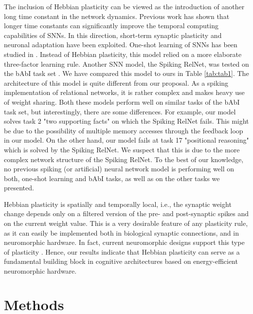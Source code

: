 \documentclass{article}
\begin{document}
The inclusion of Hebbian plasticity can be viewed as the introduction of another long time constant in the network dynamics. Previous work has shown that longer time constants can significantly improve the temporal computing capabilities of SNNs. In this direction, short-term synaptic plasticity \cite{mongillo2008synaptic,maass2002real} and neuronal adaptation \cite{salaj2021spike} have been exploited. One-shot learning of SNNs has been studied in \cite{scherr2020one}. Instead of Hebbian plasticity, this model relied on a more elaborate three-factor learning rule. Another SNN model, the Spiking RelNet, was tested on the bAbI task set \cite{plank2021long}. We have compared this model to ours in Table \ref{tab:tab1}. The architecture of this model is quite different from our proposal. As a spiking implementation of relational networks, it is rather complex and makes heavy use of weight sharing. Both these models perform well on similar tasks of the bAbI task set, but interestingly, there are some differences. For example, our model solves task \num{2} "two supporting facts" on which the Spiking RelNet fails. This might be due to the possibility of multiple memory accesses through the feedback loop in our model. On the other hand, our model fails at task \num{17} "positional reasoning" which is solved by the Spiking RelNet. We suspect that this is due to the more complex network structure of the Spiking RelNet.
To the best of our knowledge, no previous spiking (or artificial) neural network model is performing well on both, one-shot learning and bAbI tasks, as well as on the other tasks we presented.

Hebbian plasticity is spatially and temporally local, i.e., the synaptic weight change depends only on a filtered version of the pre- and post-synaptic spikes and on the current weight value. This is a very desirable feature of any plasticity rule, as it can easily be implemented both in biological synaptic connections, and in neuromorphic hardware. In fact, current neuromorphic designs support this type of plasticity \cite{davies2018loihi}. Hence, our results indicate that Hebbian plasticity can serve as a fundamental building block in cognitive architectures based on energy-efficient neuromorphic hardware.

\section{Methods}
\end{document}
